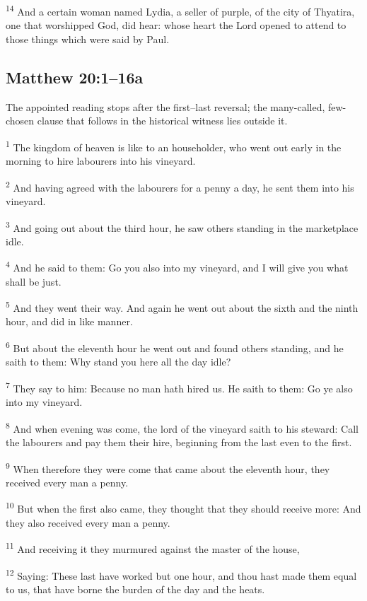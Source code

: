 \textsuperscript{14} And a certain woman named Lydia, a seller of purple, of the city of Thyatira, one that worshipped God, did hear: whose heart the Lord opened to attend to those things which were said by Paul.

\subsection{Matthew 20:1--16a}
\label{proper-gospel}
The appointed reading stops after the first--last reversal; the many-called, few-chosen clause that follows in the historical witness lies outside it.

\textsuperscript{1} The kingdom of heaven is like to an householder, who went out early in the morning to hire labourers into his vineyard.

\textsuperscript{2} And having agreed with the labourers for a penny a day, he sent them into his vineyard.

\textsuperscript{3} And going out about the third hour, he saw others standing in the marketplace idle.

\textsuperscript{4} And he said to them: Go you also into my vineyard, and I will give you what shall be just.

\textsuperscript{5} And they went their way. And again he went out about the sixth and the ninth hour, and did in like manner.

\textsuperscript{6} But about the eleventh hour he went out and found others standing, and he saith to them: Why stand you here all the day idle?

\textsuperscript{7} They say to him: Because no man hath hired us. He saith to them: Go ye also into my vineyard.

\textsuperscript{8} And when evening was come, the lord of the vineyard saith to his steward: Call the labourers and pay them their hire, beginning from the last even to the first.

\textsuperscript{9} When therefore they were come that came about the eleventh hour, they received every man a penny.

\textsuperscript{10} But when the first also came, they thought that they should receive more: And they also received every man a penny.

\textsuperscript{11} And receiving it they murmured against the master of the house,

\textsuperscript{12} Saying: These last have worked but one hour, and thou hast made them equal to us, that have borne the burden of the day and the heats.

